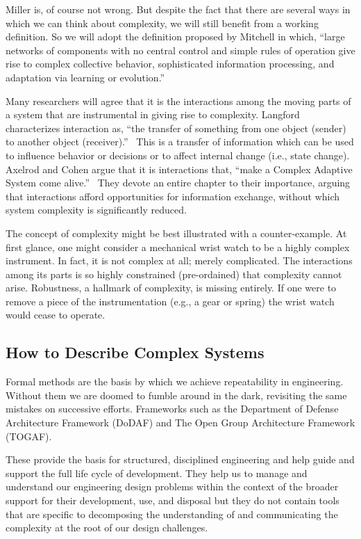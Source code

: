 \documentclass[jou,apacite]{apa6}
\begin{document}
Miller is, of course not wrong.  But despite the fact that there are several ways in which we can think about complexity, we will still benefit from a working definition.  So we will adopt the definition proposed by Mitchell in which, ``large networks of components with no central control and simple rules of operation give rise to complex collective behavior, sophisticated information processing, and adaptation via learning or evolution.''~\cite[page 13]{Mitchell}

Many researchers will agree that it is the interactions among the moving parts of a system that are instrumental in giving rise to complexity.  Langford characterizes interaction as, ``the transfer of something from one object (sender) to another object (receiver).''~\cite[page 48]{Langford}  This is a transfer of information which can be used to influence behavior or decisions or to affect internal change (i.e., state change).  Axelrod and Cohen argue that it is interactions that, ``make a Complex Adaptive System come alive.''~\cite[page 63]{Axelrod} They devote an entire chapter to their importance, arguing that interactions afford opportunities for information exchange, without which system complexity is significantly reduced.  

The concept of complexity might be best illustrated with a counter-example.  At first glance, one might consider a mechanical wrist watch to be a highly complex instrument.  In fact, it is not complex at all; merely complicated.  The interactions among its parts is so highly constrained (pre-ordained) that complexity cannot arise.  Robustness, a hallmark of complexity, is missing entirely.  If one were to remove a piece of the instrumentation (e.g., a gear or spring) the wrist watch
would cease to operate.

\subsection{How to Describe Complex Systems}  %
Formal methods are the basis by which we achieve repeatability in engineering.  Without them we are doomed to fumble around in the dark, revisiting the same mistakes on successive efforts.  Frameworks such as the Department of Defense Architecture Framework (DoDAF) and The Open Group Architecture Framework (TOGAF).  

These provide the basis for structured, disciplined engineering and help guide and support the full life cycle of development.  They help us to manage and understand our engineering design problems within the context of the broader support for their development, use, and disposal but they do not contain tools that are specific to decomposing the understanding of and communicating the complexity at the root of our design challenges.
\end{document}
